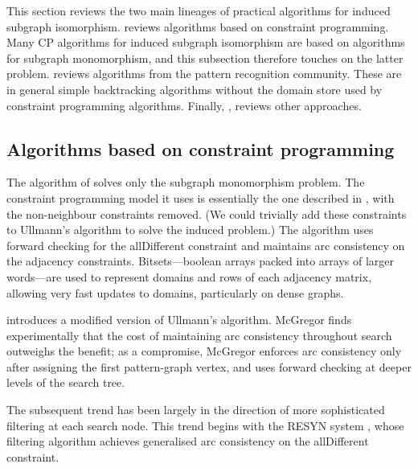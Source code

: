 This section reviews the two main lineages of practical algorithms
for induced subgraph isomorphism.   reviews algorithms
based on constraint programming.  Many CP algorithms for induced subgraph
isomorphism are based on algorithms for subgraph monomorphism, and this
subsection therefore touches on the latter problem.  
reviews algorithms from the pattern recognition community. These are in general
simple backtracking algorithms without the domain store used by constraint
programming algorithms.  Finally, , reviews
other approaches.

\subsection{Algorithms based on constraint programming}\label{subsec:cp-sip}

The algorithm of \citet{ullmann1976algorithm} solves only the subgraph
monomorphism problem.  The constraint programming model it uses is essentially
the one described in , with the non-neighbour
constraints removed.  (We could trivially add these constraints to Ullmann's
algorithm to solve the induced problem.) The algorithm uses forward checking
for the allDifferent constraint and maintains arc consistency on the adjacency
constraints.
Bitsets---boolean arrays
packed into arrays of larger words---are used to represent domains and rows of each
adjacency matrix, allowing very fast updates to domains, particularly on dense
graphs.

\citet{DBLP:journals/isci/McGregor79} introduces a modified version of
Ullmann's algorithm.  McGregor finds experimentally that the cost of
maintaining arc consistency throughout search outweighs the benefit; as a
compromise, McGregor enforces arc consistency only after assigning the first
pattern-graph vertex, and uses forward checking at deeper levels of the search
tree.

The subsequent trend has been largely in the direction of more sophisticated
filtering at each search node.  This trend begins with the RESYN system
\citep{vism92,regin1995developpement}, whose filtering algorithm achieves
generalised arc consistency on the allDifferent constraint.

